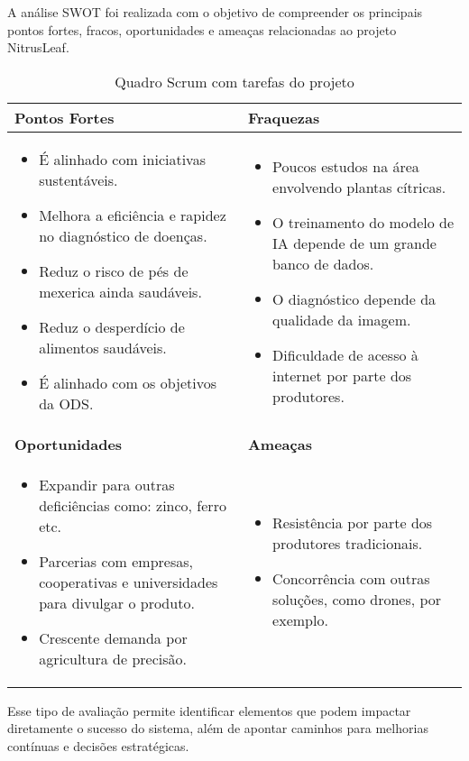 A análise SWOT foi realizada com o objetivo de compreender os principais
pontos fortes, fracos, oportunidades e ameaças relacionadas ao projeto NitrusLeaf.

\begin{table}[h]
\centering
\caption{Quadro Scrum com tarefas do projeto}
\renewcommand{\arraystretch}{1.2}
\begin{tabularx}{\textwidth}{|>{\raggedright\arraybackslash}X|>{\raggedright\arraybackslash}X|}
\hline
\textbf{Pontos Fortes} & \textbf{Fraquezas} \\
\hline
\begin{itemize}[left=0pt]
  \item É alinhado com iniciativas sustentáveis.
  \item Melhora a eficiência e rapidez no diagnóstico de doenças.
  \item Reduz o risco de pés de mexerica ainda saudáveis.
  \item Reduz o desperdício de alimentos saudáveis.
  \item É alinhado com os objetivos da ODS.
\end{itemize}
&
\begin{itemize}[left=0pt]
  \item Poucos estudos na área envolvendo plantas cítricas.
  \item O treinamento do modelo de IA depende de um grande banco de dados.
  \item O diagnóstico depende da qualidade da imagem.
  \item Dificuldade de acesso à internet por parte dos produtores.
\end{itemize}
\\
\hline
\textbf{Oportunidades} & \textbf{Ameaças} \\
\hline
\begin{itemize}[left=0pt]
  \item Expandir para outras deficiências como: zinco, ferro etc.
  \item Parcerias com empresas, cooperativas e universidades para divulgar o produto.
  \item Crescente demanda por agricultura de precisão.
\end{itemize}
&
\begin{itemize}[left=0pt]
  \item Resistência por parte dos produtores tradicionais.
  \item Concorrência com outras soluções, como drones, por exemplo.
\end{itemize}
\\
\hline
\end{tabularx}
\medskip
{}
\end{table}
\medskip

Esse tipo de avaliação permite identificar elementos que podem impactar
diretamente o sucesso do sistema, além de apontar caminhos para melhorias contínuas
e decisões estratégicas.